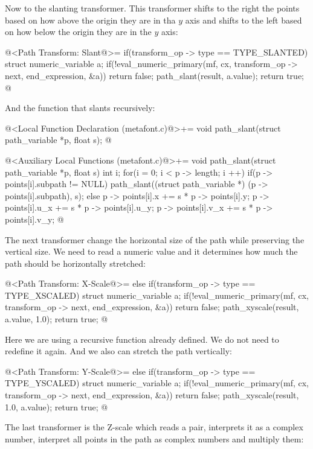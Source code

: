 Now to the slanting transformer. This transformer shifts to the right
the points based on how above the origin they are in tha $y$ axis and
shifts to the left based on how below the origin they are in the $y$
axis:

\iniciocodigo
@<Path Transform: Slant@>=
if(transform_op -> type == TYPE_SLANTED){
  struct numeric_variable a;
  if(!eval_numeric_primary(mf, cx, transform_op -> next, end_expression,
                          &a))
    return false;
  path_slant(result, a.value);  
  return true;
}
@
\fimcodigo

And the function that slants recursively:

\iniciocodigo
@<Local Function Declaration (metafont.c)@>+=
void path_slant(struct path_variable *p, float s);
@
\fimcodigo

\iniciocodigo
@<Auxiliary Local Functions (metafont.c)@>+=
void path_slant(struct path_variable *p, float s){
  int i;
  for(i = 0; i < p -> length; i ++){
    if(p -> points[i].subpath != NULL)
      path_slant((struct path_variable *) (p -> points[i].subpath), s);
    else{
      p -> points[i].x += s * p -> points[i].y;
      p -> points[i].u_x += s * p -> points[i].u_y;
      p -> points[i].v_x += s * p -> points[i].v_y;
    }
  }
}
@
\fimcodigo


The next transformer change the horizontal size of the path while
preserving the vertical size. We need to read a numeric value and it
determines how much the path should be horizontally stretched:

\iniciocodigo
@<Path Transform: X-Scale@>=
else if(transform_op -> type == TYPE_XSCALED){
  struct numeric_variable a;
  if(!eval_numeric_primary(mf, cx, transform_op -> next, end_expression,
                           &a))
    return false;
  path_xyscale(result, a.value, 1.0);  
  return true;
}
@
\fimcodigo

Here we are using a recursive function already defined. We do not need
to redefine it again. And we also can stretch the path vertically:

\iniciocodigo
@<Path Transform: Y-Scale@>=
else if(transform_op -> type == TYPE_YSCALED){
  struct numeric_variable a;
  if(!eval_numeric_primary(mf, cx, transform_op -> next, end_expression,
                           &a))
    return false;
  path_xyscale(result, 1.0, a.value);  
  return true;
}
@
\fimcodigo

The last transformer is the Z-scale which reads a pair, interprets it
as a complex number, interpret all points in the path as complex
numbers and multiply them:

